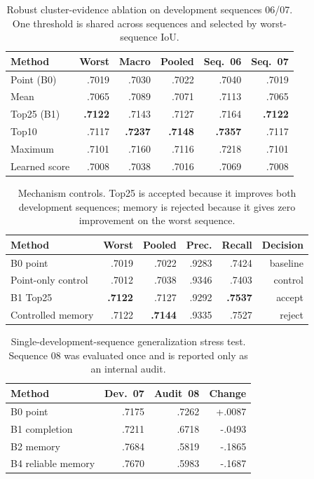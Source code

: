 
\begin{table}[t]
\centering
\caption{Robust cluster-evidence ablation on development sequences 06/07.
One threshold is shared across sequences and selected by worst-sequence IoU.}
\label{tab:cluster_ablation}
\small
\begin{tabular}{lrrrrr}
\toprule
Method & Worst & Macro & Pooled & Seq.~06 & Seq.~07 \\
\midrule
Point (B0)       & .7019 & .7030 & .7022 & .7040 & .7019 \\
Mean             & .7065 & .7089 & .7071 & .7113 & .7065 \\
Top25 (B1)       & \textbf{.7122} & .7143 & .7127 & .7164 & \textbf{.7122} \\
Top10            & .7117 & \textbf{.7237} & \textbf{.7148} & \textbf{.7357} & .7117 \\
Maximum          & .7101 & .7160 & .7116 & .7218 & .7101 \\
Learned score    & .7008 & .7038 & .7016 & .7069 & .7008 \\
\bottomrule
\end{tabular}
\end{table}

\begin{table}[t]
\centering
\caption{Mechanism controls. Top25 is accepted because it improves both
development sequences; memory is rejected because it gives zero improvement
on the worst sequence.}
\label{tab:mechanism_controls}
\small
\begin{tabular}{lrrrrr}
\toprule
Method & Worst & Pooled & Prec. & Recall & Decision \\
\midrule
B0 point              & .7019 & .7022 & .9283 & .7424 & baseline \\
Point-only control    & .7012 & .7038 & .9346 & .7403 & control \\
B1 Top25              & \textbf{.7122} & .7127 & .9292 & \textbf{.7537} & accept \\
Controlled memory     & .7122 & \textbf{.7144} & .9335 & .7527 & reject \\
\bottomrule
\end{tabular}
\end{table}

\begin{table}[t]
\centering
\caption{Single-development-sequence generalization stress test. Sequence 08
was evaluated once and is reported only as an internal audit.}
\label{tab:generalization_stress}
\small
\begin{tabular}{lrrr}
\toprule
Method & Dev.~07 & Audit~08 & Change \\
\midrule
B0 point           & .7175 & .7262 & +.0087 \\
B1 completion      & .7211 & .6718 & -.0493 \\
B2 memory          & .7684 & .5819 & -.1865 \\
B4 reliable memory & .7670 & .5983 & -.1687 \\
\bottomrule
\end{tabular}
\end{table}

